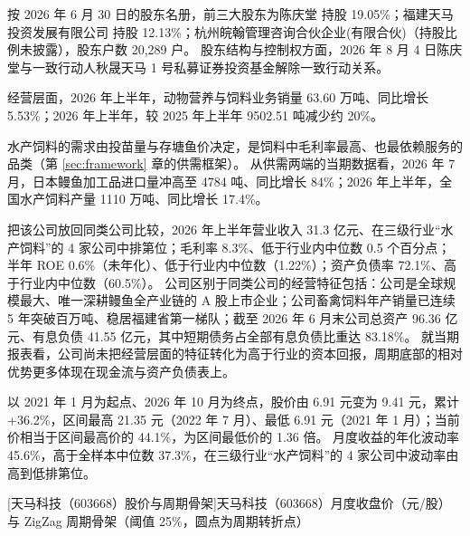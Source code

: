  按 2026 年 6 月 30 日的股东名册，前三大股东为陈庆堂 持股 19.05\%；福建天马投资发展有限公司 持股 12.13\%；杭州皖翰管理咨询合伙企业(有限合伙)（持股比例未披露），股东户数 20,289 户。 股东结构与控制权方面，2026 年 8 月 4 日陈庆堂与一致行动人秋晟天马 1 号私募证券投资基金解除一致行动关系。

 经营层面，2026 年上半年，动物营养与饲料业务销量 63.60 万吨、同比增长 5.53\%；2026 年上半年，较 2025 年上半年 9502.51 吨减少约 20\%。

 水产饲料的需求由投苗量与存塘鱼价决定，是饲料中毛利率最高、也最依赖服务的品类（第 \ref{sec:framework} 章的供需框架）。 从供需两端的当期数据看，2026 年 7 月，日本鳗鱼加工品进口量冲高至 4784 吨、同比增长 84\%；2026 年上半年，全国水产饲料产量 1110 万吨、同比增长 17.4\%。

 把该公司放回同类公司比较，2026 年上半年营业收入 31.3 亿元、在三级行业“水产饲料”的 4 家公司中排第位；毛利率 8.3\%、低于行业内中位数 0.5 个百分点；半年 ROE 0.6\%（未年化）、低于行业内中位数（1.22\%）；资产负债率 72.1\%、高于行业内中位数（60.5\%）。 公司区别于同类公司的经营特征包括：公司是全球规模最大、唯一深耕鳗鱼全产业链的 A 股上市企业；公司畜禽饲料年产销量已连续 5 年突破百万吨、稳居福建省第一梯队；截至 2026 年 6 月末公司总资产 96.36 亿元、有息负债 41.55 亿元，其中短期债务占全部有息负债比重达 83.18\%。 就当期报表看，公司尚未把经营层面的特征转化为高于行业的资本回报，周期底部的相对优势更多体现在现金流与资产负债表上。

 以 2021 年 1 月为起点、2026 年 10 月为终点，股价由 6.91 元变为 9.41 元，累计 +36.2\%，区间最高 21.35 元（2022 年 7 月）、最低 6.91 元（2021 年 1 月）；当前价相当于区间最高价的 44.1\%，为区间最低价的 1.36 倍。 月度收益的年化波动率 45.6\%，高于全样本中位数 37.3\%，在三级行业“水产饲料”的 4 家公司中波动率由高到低排第位。

\begin{center}
\begin{minipage}{\textwidth}\centering
{}

[天马科技（603668）股价与周期骨架]{天马科技（603668）月度收盘价（元/股）与 ZigZag 周期骨架（阈值 25\%，圆点为周期转折点）}
\end{minipage}
\end{center}


